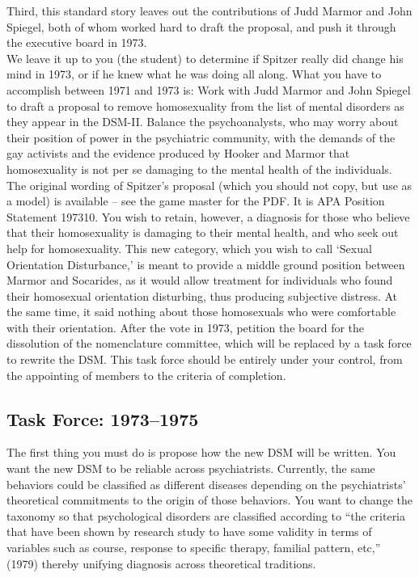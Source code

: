 Third, this standard story leaves out the contributions of Judd Marmor and John Spiegel, both of whom worked hard to draft the proposal, and push it through the executive board in 1973.\\
We leave it up to you (the student) to determine if Spitzer really did change his mind in 1973, or if he knew what he was doing all along. What you have to accomplish between 1971 and 1973 is:
Work with Judd Marmor and John Spiegel to draft a proposal to remove homosexuality from the list of mental disorders as they appear in the DSM-II. Balance the psychoanalysts, who may worry about their position of power in the psychiatric community, with the demands of the gay activists and the evidence produced by Hooker and Marmor that homosexuality is not per se damaging to the mental health of the individuals. The original wording of Spitzer's proposal (which you should not copy, but use as a model) is available – see the game master for the PDF. It is APA Position Statement 197310.
You wish to retain, however, a diagnosis for those who believe that their homosexuality is damaging to their mental health, and who seek out help for homosexuality. This new category, which you wish to call `Sexual Orientation Disturbance,' is meant to provide a middle ground position between Marmor and Socarides, as it would allow treatment for individuals who found their homosexual orientation disturbing, thus producing subjective distress. At the same time, it said nothing about those homosexuals who were comfortable with their orientation.
After the vote in 1973, petition the board for the dissolution of the nomenclature committee, which will be replaced by a task force to rewrite the DSM. This task force should be entirely under your control, from the appointing of members to the criteria of completion.

\subsection{Task Force: 1973--1975}
\label{taskforce:1973-1975}

The first thing you must do is propose how the new DSM will be written. You want the new DSM to be reliable across psychiatrists. Currently, the same behaviors could be classified as different diseases depending on the psychiatrists' theoretical commitments to the origin of those behaviors. You want to change the taxonomy so that psychological disorders are classified according to “the criteria that have been shown by research study to have some validity in terms of variables such as course, response to specific therapy, familial pattern, etc,” (1979) thereby unifying diagnosis across theoretical traditions.

